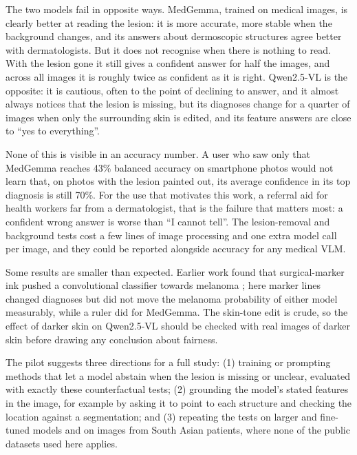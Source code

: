 The two models fail in opposite ways. MedGemma, trained on medical images, is clearly better at reading the lesion: it is more accurate, more stable when the background changes, and its answers about dermoscopic structures agree better with dermatologists. But it does not recognise when there is nothing to read. With the lesion gone it still gives a confident answer for half the images, and across all images it is roughly twice as confident as it is right. Qwen2.5-VL is the opposite: it is cautious, often to the point of declining to answer, and it almost always notices that the lesion is missing, but its diagnoses change for a quarter of images when only the surrounding skin is edited, and its feature answers are close to ``yes to everything''.

None of this is visible in an accuracy number. A user who saw only that MedGemma reaches 43\% balanced accuracy on smartphone photos would not learn that, on photos with the lesion painted out, its average confidence in its top diagnosis is still 70\%. For the use that motivates this work, a referral aid for health workers far from a dermatologist, that is the failure that matters most: a confident wrong answer is worse than ``I cannot tell''. The lesion-removal and background tests cost a few lines of image processing and one extra model call per image, and they could be reported alongside accuracy for any medical VLM.

Some results are smaller than expected. Earlier work found that surgical-marker ink pushed a convolutional classifier towards melanoma \cite{winkler2019}; here marker lines changed diagnoses but did not move the melanoma probability of either model measurably, while a ruler did for MedGemma. The skin-tone edit is crude, so the effect of darker skin on Qwen2.5-VL should be checked with real images of darker skin before drawing any conclusion about fairness.

The pilot suggests three directions for a full study: (1) training or prompting methods that let a model abstain when the lesion is missing or unclear, evaluated with exactly these counterfactual tests; (2) grounding the model's stated features in the image, for example by asking it to point to each structure and checking the location against a segmentation; and (3) repeating the tests on larger and fine-tuned models and on images from South Asian patients, where none of the public datasets used here applies.
